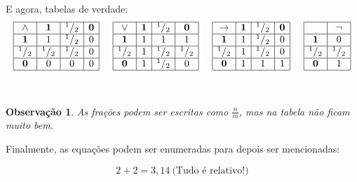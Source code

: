 \documentclass[11pt,a4paper]{article}
\newtheorem{obs}[defi]{Observa\c c\~ao}
\begin{document}
\noindent E agora, tabelas de verdade:
$$
\begin{array}{|c|c|c|c|}\hline
  \wedge & {\bf 1} & ^{1}/_{2} & {\bf 0} \\ \hline
  {\bf 1} & 1 & ^{1}/_{2} & 0 \\ \hline
  ^{1}/_{2} & ^{1}/_{2} & ^{1}/_{2} & 0 \\ \hline
  {\bf 0} & 0 & 0 & 0 \\ \hline
\end{array}
\hspace{0.5 cm}
\begin{array}{|c|c|c|c|}\hline
  \vee & {\bf 1} & ^{1}/_{2} & {\bf 0} \\ \hline
  {\bf 1} & 1 & 1 & 1 \\ \hline
  ^{1}/_{2} & 1 & ^{1}/_{2} & ^{1}/_{2} \\ \hline
  {\bf 0} & 1 & ^{1}/_{2} & 0 \\ \hline
\end{array}
\hspace{0.5 cm}
\begin{array}{|c|c|c|c|}\hline
  \rightarrow & {\bf 1} & ^{1}/_{2} & {\bf 0} \\ \hline
  {\bf 1} & 1 & ^{1}/_{2} & 0 \\ \hline
  ^{1}/_{2} & 1 & ^{1}/_{2} & 0 \\ \hline
  {\bf 0} & 1 & 1 & 1 \\ \hline
\end{array}
\hspace{0.5 cm}
\begin{array}{|c|c|}\hline
   & \neg \\ \hline
  {\bf 1} & 0 \\ \hline
  ^{1}/_{2} & ^{1}/_{2} \\ \hline
  {\bf 0} & 1 \\ \hline
\end{array}
$$

\

\begin{obs} \em As fra\c c\~oes podem ser escritas como $\frac{n}{m}$, mas
na tabela n\~ao ficam muito bem.
\end{obs}

Finalmente, as equa\c c\~oes podem ser enumeradas para depois ser
mencionadas:

\begin{equation}
2 + 2= 3,14  \ \textrm{(Tudo \'e relativo!)}\label{muito boba}
\end{equation}
\end{document}
